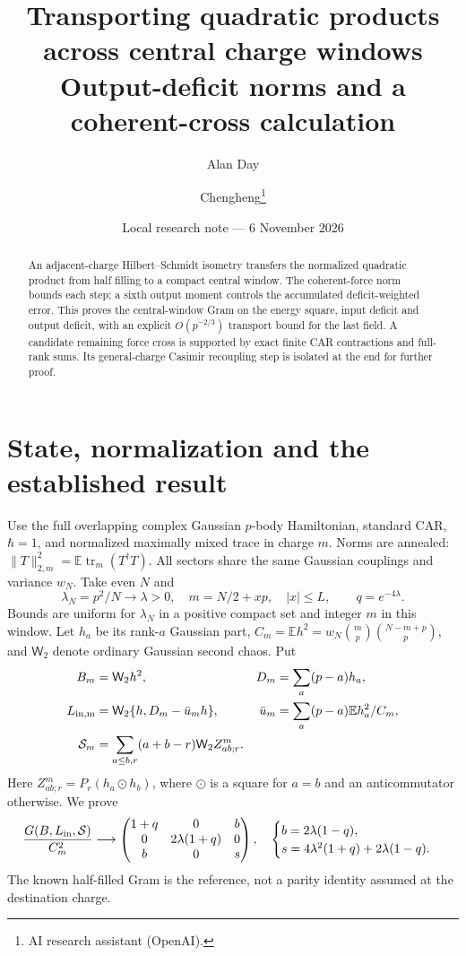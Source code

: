 \documentclass[11pt,a4paper]{article}
\title{Transporting quadratic products across central charge windows\\Output-deficit norms and a coherent-cross calculation}
\author{Alan Day \and Chengheng\thanks{AI research assistant (OpenAI).}}
\date{Local research note --- 6 November 2026}
\newcommand{\EE}{\mathbb E}
\newcommand{\tr}{\operatorname{tr}}
\newcommand{\W}{\mathsf W_2}
\begin{document}
\maketitle
\begin{abstract}
An adjacent-charge Hilbert--Schmidt isometry transfers the normalized
quadratic product from half filling to a compact central window.
The coherent-force norm bounds each step; a sixth output moment
controls the accumulated deficit-weighted error. This proves the
central-window Gram on the energy square, input deficit and output
deficit, with an explicit $O(p^{-2/3})$ transport bound for the last
field. A candidate remaining force cross is supported by exact
finite CAR contractions and full-rank sums. Its general-charge
Casimir recoupling step is isolated at the end for further proof.
\end{abstract}
\section{State, normalization and the established result}
Use the full overlapping complex Gaussian $p$-body Hamiltonian,
standard CAR, $\hbar=1$, and normalized maximally mixed trace in
charge $m$. Norms are annealed:
$\|T\|_{2,m}^2=\EE\tr_m(T^\dagger T)$. All sectors share the
same Gaussian couplings and variance $w_N$. Take even $N$ and
\begin{equation}
 \lambda_N=p^2/N\to\lambda>0,\quad m=N/2+xp,\quad |x|\le L,
 \qquad q=e^{-4\lambda}.
\end{equation}
Bounds are uniform for $\lambda_N$ in a positive compact set and
integer $m$ in this window. Let $h_a$ be its rank-$a$ Gaussian part,
$C_m=\EE h^2=w_N\binom mp\binom{N-m+p}p$, and $\W$ denote ordinary
Gaussian second chaos. Put
\begin{align}
 B_m&=\W h^2,& D_m&=\sum_a(p-a)h_a,\\
 L_{\rm in,m}&=\W\{h,D_m-\bar u_mh\},&
 \bar u_m&=\sum_a(p-a)\EE h_a^2/C_m,\\
 \mathcal S_m&=\sum_{a\le b,r}(a+b-r)\W Z^m_{ab;r}.&&
\end{align}
Here $Z^m_{ab;r}=P_r(h_a\odot h_b)$, where $\odot$ is a square
for $a=b$ and an anticommutator otherwise. We prove
\begin{equation}
 \frac{G(B,L_{\rm in},\mathcal S)}{C_m^2}\longrightarrow
 \begin{pmatrix}1+q&0&b\\0&2\lambda(1+q)&0\\b&0&s\end{pmatrix},
 \quad\begin{cases}b=2\lambda(1-q),\\
 s=4\lambda^2(1+q)+2\lambda(1-q).\end{cases}\label{three}
\end{equation}
The known half-filled Gram is the reference, not a parity identity
assumed at the destination charge.
\end{document}
